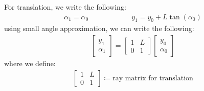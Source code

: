 \documentclass[11pt]{book}
\theoremstyle{break}
\theoremstyle{break}
\newcommand{\bmat}[1]{\begin{bmatrix} #1 \end{bmatrix}}
\begin{document}
For translation, we write the following:
\begin{align*}
\alpha_1 = \alpha_0 \qquad\qquad\qquad y_1 = y_0 + L \tan(\alpha_0)
\end{align*}
using small angle approximation, we can write the following:
\begin{align*}
\bmat{y_1 \\ \alpha_1} = \bmat{1 & L \\ 0 & 1} \bmat{y_0 \\ \alpha_0}
\end{align*}
where we define:
\begin{align*}
 \bmat{1 & L \\ 0 & 1}  \coloneqq \text{ray matrix for translation}
\end{align*}

\hfill\break
\end{document}
